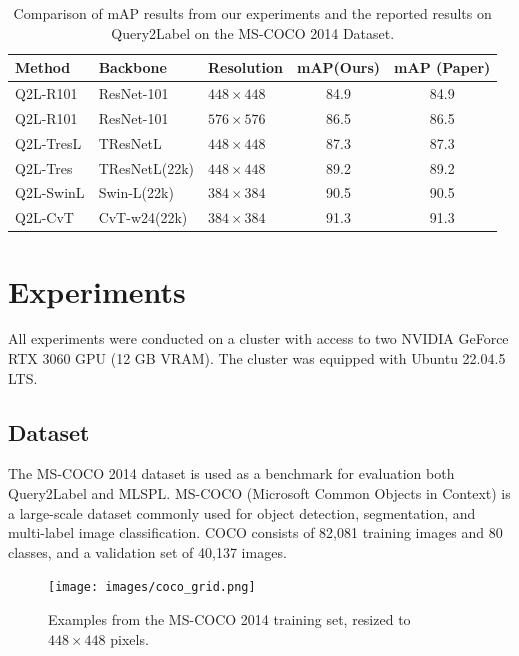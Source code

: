 \documentclass[lettersize,journal]{IEEEtran}
\begin{document}
\begin{table}[t]
    \small
    \caption{Comparison of mAP results from our experiments and the reported results on Query2Label on the MS-COCO 2014 Dataset.}
    \label{tab:q2l_map_comparison}
    \centering
    \begin{tabular}{l l l c c}
    \toprule
    \textbf{Method} & \textbf{Backbone} & \textbf{Resolution} & \textbf{mAP(Ours)} & \textbf{mAP (Paper)} \\
    \midrule
    Q2L-R101     & ResNet-101     & $448\times448$ & 84.9 & 84.9 \\
    Q2L-R101     & ResNet-101     & $576\times576$ & 86.5 & 86.5 \\
    Q2L-TresL    & TResNetL       & $448\times448$ & 87.3 & 87.3 \\
    Q2L-Tres     & TResNetL(22k)  & $448\times448$ & 89.2 & 89.2 \\
    Q2L-SwinL    & Swin-L(22k)    & $384\times384$ & 90.5 & 90.5 \\
    Q2L-CvT      & CvT-w24(22k)   & $384\times384$ & 91.3 & 91.3 \\
    \bottomrule
    \end{tabular}
\end{table}

\section{Experiments}
All experiments were conducted on a cluster with access to two NVIDIA GeForce RTX 3060 GPU (12 GB VRAM). The cluster was equipped with Ubuntu 22.04.5 LTS.

\subsection{Dataset}
The MS-COCO 2014 \cite{coco14} dataset is used as a benchmark for evaluation both Query2Label and MLSPL. MS-COCO (Microsoft Common Objects in Context) is a large-scale dataset commonly used for object detection, segmentation, and multi-label image classification. COCO consists of 82,081 training images and 80 classes, and a validation set of 40,137 images.

\begin{figure}[t]
    \centering
    \texttt{[image: images/coco\_grid.png]}
    \caption{Examples from the MS-COCO 2014 training set, resized to $448 \times 448$ pixels.}
    \label{fig:coco-examples}
\end{figure}
\end{document}
